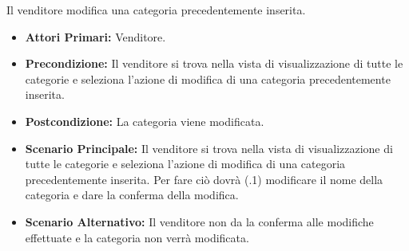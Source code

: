 Il venditore modifica una categoria precedentemente inserita.
\begin{itemize}
    \item \textbf{Attori Primari:} Venditore.
    \item \textbf{Precondizione:} Il venditore si trova nella vista di visualizzazione di tutte le categorie e seleziona l'azione di modifica di una categoria precedentemente inserita.
    \item \textbf{Postcondizione:} La categoria viene modificata.
    \item \textbf{Scenario Principale:} Il venditore si trova nella vista di visualizzazione di tutte le categorie e seleziona l'azione di modifica di una categoria precedentemente inserita. Per fare ciò dovrà (\actualUC.1) modificare il nome della categoria e dare la conferma della modifica.
    \item \textbf{Scenario Alternativo:} Il venditore non da la conferma alle modifiche effettuate e la categoria non verrà modificata.
\end{itemize}

\resetSubUC

